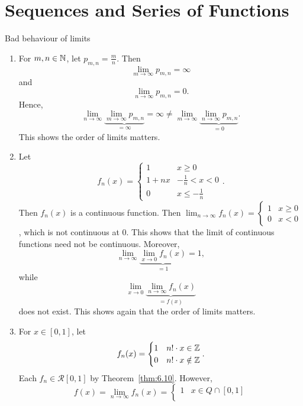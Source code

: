 \chapter{Sequences and Series of Functions}
\allowdisplaybreaks
\begin{example}
	\label{eg:7.1}
	Bad behaviour of limits
	\begin{enumerate}[label=(\arabic*)]
		\item For $m,n \in \mathbb{N}$, let $p_{m,n}=\frac{m}{n}$.
		      Then
		      \[
			      \lim_{m\to \infty}{p_{m,n}}=\infty
		      \]
		      and
		      \[
			      \lim_{n\to \infty}{p_{m,n}}=0
			      .\]
		      Hence,
		      \[
			      \lim_{n\to \infty}{\underbrace{\lim_{m\to \infty}{p_{m,n}}}_{=\infty}}=\infty \neq \lim_{m\to \infty}{\underbrace{\lim_{n\to \infty}{p_{m,n}}}_{=0}}
			      .\]
		      This shows the order of limits matters.
		\item Let
		      \[
			      f_n(x)=
			      \begin{cases}
				      1    & x\ge 0            \\
				      1+nx & -\frac{1}{n}<x<0  \\
				      0    & x\le -\frac{1}{n}
			      \end{cases}
			      .\]
		      Then $f_n(x)$ is a continuous function.
		      Then $\lim_{n\to \infty}{f_n(x)}= \begin{cases}
				      1 & x\ge 0 \\
				      0 & x<0
			      \end{cases}$, which is not continuous at $0$.
		      This shows that the limit of continuous functions need not be continuous.
		      Moreover,
		      \[
			      \lim_{n\to \infty}{\underbrace{\lim_{x\to 0}{f_{n}(x)}}_{=1}}=1
			      ,\]
		      while
		      \[
			      \lim_{x\to 0}{\underbrace{\lim_{n\to \infty}{f_{n}(x)}}_{=f(x)}}
		      \]
		      does not exist. This shows again that the order of limits matters.
		\item
		      For $x \in [0,1]$, let \[
			      f_n(x)= \begin{cases}
				      1 & n!\cdot x \in \mathbb{Z}    \\
				      0 & n!\cdot x \notin \mathbb{Z} \\
			      \end{cases}
			      .\]
		      Each $f_n \in \mathscr{R}[0,1]$ by Theorem~\ref{thm:6.10}.
		      However, \[
			      f(x)=\lim_{n\to \infty}{f_n(x)}= \begin{cases}
				      1 & x \in Q \cap [0,1]    \\

\end{cases}\]
\end{enumerate}
\end{example}
